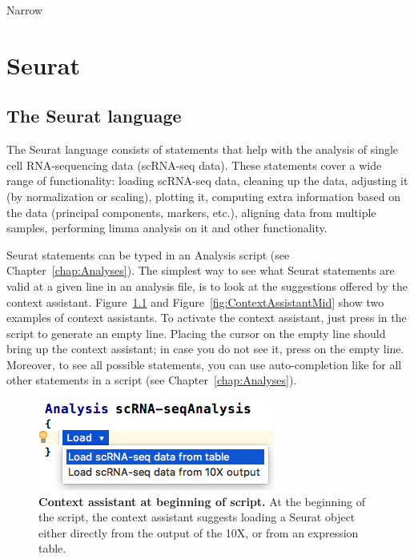 Narrow


\chapter{Seurat}\label{chap:Seurat}

\section{The Seurat language}

The Seurat language consists of statements that help with the analysis of
single cell RNA-sequencing data (scRNA-seq data). These statements cover a wide range of
functionality: loading scRNA-seq data, cleaning up the data, adjusting it (by normalization
or scaling), plotting it, computing extra information based on the data (principal components, markers,
etc.), aligning data from multiple samples, performing limma analysis on it and other
functionality.

Seurat statements can be typed in an Analysis script (see Chapter~\ref{chap:Analyses}).
The simplest way to see what Seurat statements are valid at a given line in an
analysis file, is to look at the suggestions offered by the context assistant. Figure~\ref{fig:ContextAssistantBeg}
and Figure~\ref{fig:ContextAssistantMid} show two examples of context assistants.
To activate the context assistant, just press
\keys{\return} in the script to generate an empty line. Placing the cursor on the empty line should
bring up the context assistant; in case you do not see it, press \keys{\space} on the empty line.
Moreover, to see all possible statements, you can use auto-completion like for all other
statements in a script (see Chapter~\ref{chap:Analyses}).

\begin{figure}
  \centering
  \includegraphics[width=\figWidthTiny]{figures/ContextAssistantBeg.png}
    \caption[Context assistant at beginning of script.]{\textbf{Context assistant at
    beginning of script.} At the beginning of the script, the
    context assistant suggests loading a Seurat object either directly from the output
    of the 10X, or from an expression table.}
\label{fig:ContextAssistantBeg}
\end{figure}

